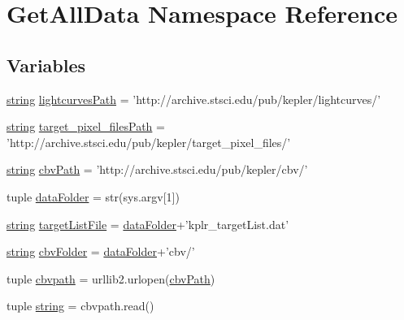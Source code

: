 \hypertarget{namespace_get_all_data}{\section{Get\-All\-Data Namespace Reference}
\label{namespace_get_all_data}
}
\subsection*{Variables}
\begin{DoxyCompactItemize}
\item 
\hyperlink{namespace_get_all_data_aa3f14258ba79c9dd527fc1805b92c818}{string} \hyperlink{namespace_get_all_data_aa7dab644473a8e6caaa150aa36384dbe}{lightcurves\-Path} = 'http\-://archive.\-stsci.\-edu/pub/kepler/lightcurves/'
\item 
\hyperlink{namespace_get_all_data_aa3f14258ba79c9dd527fc1805b92c818}{string} \hyperlink{namespace_get_all_data_a45b4d0dc9728eff931ef547819c19225}{target\-\_\-pixel\-\_\-files\-Path} = 'http\-://archive.\-stsci.\-edu/pub/kepler/target\-\_\-pixel\-\_\-files/'
\item 
\hyperlink{namespace_get_all_data_aa3f14258ba79c9dd527fc1805b92c818}{string} \hyperlink{namespace_get_all_data_a0d44f716af41966e5d4c1e8ec5daca53}{cbv\-Path} = 'http\-://archive.\-stsci.\-edu/pub/kepler/cbv/'
\item 
tuple \hyperlink{namespace_get_all_data_a8ff73cf768ddd833d026b762528dc864}{data\-Folder} = str(sys.\-argv\mbox{[}1\mbox{]})
\item 
\hyperlink{namespace_get_all_data_aa3f14258ba79c9dd527fc1805b92c818}{string} \hyperlink{namespace_get_all_data_a651d69300ed082b3426d3910b6c6a5f7}{target\-List\-File} = \hyperlink{namespace_get_all_data_a8ff73cf768ddd833d026b762528dc864}{data\-Folder}+'kplr\-\_\-target\-List.\-dat'
\item 
\hyperlink{namespace_get_all_data_aa3f14258ba79c9dd527fc1805b92c818}{string} \hyperlink{namespace_get_all_data_a92d210ac17aea3c86c2cae13d5dcf53a}{cbv\-Folder} = \hyperlink{namespace_get_all_data_a8ff73cf768ddd833d026b762528dc864}{data\-Folder}+'cbv/'
\item 
tuple \hyperlink{namespace_get_all_data_ac340b879890051d52eef59bb312d86c6}{cbvpath} = urllib2.\-urlopen(\hyperlink{namespace_get_all_data_a0d44f716af41966e5d4c1e8ec5daca53}{cbv\-Path})
\item 
tuple \hyperlink{namespace_get_all_data_aa3f14258ba79c9dd527fc1805b92c818}{string} = cbvpath.\-read()
\item 

\end{DoxyCompactItemize}
